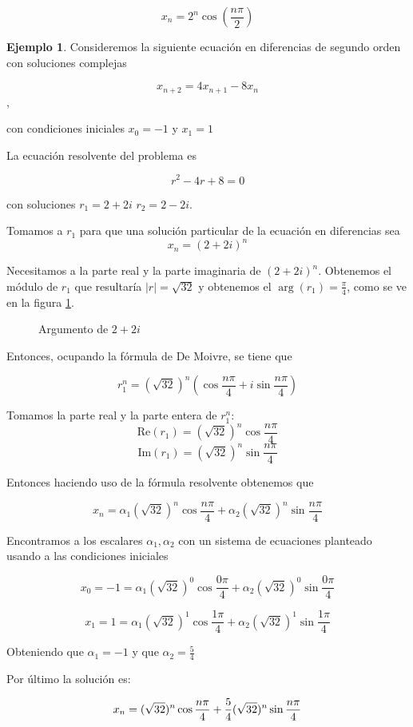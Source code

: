 \documentclass{report}
\theoremstyle{definition}
\newtheorem{ejemplo}[teorema]{Ejemplo}
\begin{document}
$$x_n=2^n\cos(\frac{n\pi}{2})$$
\bigskip
\bigskip
\begin{ejemplo}

Consideremos la siguiente ecuación en diferencias de segundo orden con soluciones complejas

$$x_{n+2}=4x_{n+1}-8x_{n}$$,

con condiciones iniciales $x_{0}=-1$ y $x_{1}=1$

 La ecuación resolvente del problema es

 $$r^2-4r+8=0$$

 con soluciones $r_{1}=2+2i$ $r_{2}=2-2i$.

\bigskip

 Tomamos a $r_{1}$ para que una solución particular de la ecuación en diferencias sea $$x_{n}=(2+2i)^n$$

 Necesitamos a la parte real y la parte imaginaria de $(2+2i)^n$. Obtenemos el módulo de $r_{1}$ que resultaría $|r|= \sqrt{32}$ y obtenemos el $\arg(r_{1})=\frac{\pi}{4}$, como se ve en la figura \ref{fig:1}.

 \begin{figure}[htp]
   \centering
   \caption{Argumento de $2+2i$}
   \label{fig:1}
 \end{figure}

Entonces, ocupando la fórmula de De Moivre, se tiene que

$$r_{1}^n=(\sqrt{32})^n(\cos{\frac{n\pi}{4}}+i\sin{\frac{n\pi}{4}})$$


Tomamos la parte real y la parte entera de $r_{1}^n$:
$$\mathrm{Re}(r_{1})=(\sqrt{32})^n\cos{\frac{n\pi}{4}}$$  $$\mathrm{Im}(r_{1})=(\sqrt{32})^n\sin{\frac{n\pi}{4}}$$


  Entonces haciendo uso de la fórmula resolvente obtenemos que

  $$x_{n}=\alpha_{1}(\sqrt{32})^n\cos{\frac{n\pi}{4}} + \alpha_{2}(\sqrt{32})^n\sin{\frac{n\pi}{4}}$$

    Encontramos a los escalares $\alpha_1,\alpha_2$ con un sistema de ecuaciones planteado usando a las condiciones iniciales

    $$x_{0}=-1=\alpha_{1}(\sqrt{32})^0\cos{\frac{0\pi}{4}} + \alpha_{2}(\sqrt{32})^0\sin{\frac{0\pi}{4}}$$
      
     $$x_{1}=1=\alpha_{1}(\sqrt{32})^1\cos{\frac{1\pi}{4}} + \alpha_{2}(\sqrt{32})^1\sin{\frac{1\pi}{4}}$$

        Obteniendo que $\alpha_{1}=-1$ y que $\alpha_{2}=\frac{5}{4}$

        Por último la solución
 es:

         $$x_{n}=\-(\sqrt{32})^n\cos{\frac{n\pi}{4}} + \frac{5}{4}(\sqrt{32})^n\sin{\frac{n\pi}{4}}$$

\end{ejemplo}
         
\end{document}
